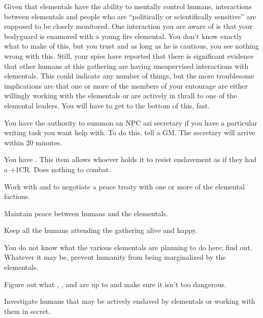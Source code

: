 \documentclass[char]{elementals}
\begin{document}
Given that elementals have the ability to mentally control humans, interactions between elementals and people who are ``politically or scientifically sensitive'' are supposed to be closely monitored. One interaction you are aware of is that your bodyguard \cRomeo{} is enamored with a young fire elemental. You don't know exactly what to make of this, but you trust \cRomeo{} and as long as he is cautious, you see nothing wrong with this. Still, your spies have reported that there is significant evidence that other humans at this gathering are having unsupervised interactions with elementals. This could indicate any number of things, but the more troublesome implications are that one or more of the members of your entourage are either willingly working with the elementals or are actively in thrall to one of the elemental leaders. You will have to get to the bottom of this, fast.



\begin{itemz}[Notes]
	\item  You have the authority to summon an NPC azi secretary if you have a particular writing task you want help with. To do this, tell a GM. The secretary will arrive within 20 minutes.
	\item You have \iEleShield{}. This item allows whoever holds it to resist enslavement as if they had a +1CR. Does nothing to combat.
\end{itemz}

\begin{itemz}[Goals]
  \item Work with \cAvatar{} and \cDiplomat{} to negotiate a peace treaty with one or more of the elemental factions.
  \item Maintain peace between humans and the elementals.
  \item Keep all the humans attending the gathering alive and happy.
  \item You do not know what the various elementals are planning to do here; find out. Whatever it may be, prevent humanity from being marginalized by the elementals.
  \item Figure out what \cGD{}, \cMS{}, and \cScientist{} are up to and make sure it isn't too dangerous.
  \item Investigate humans that may be actively enslaved by elementals or working with them in secret.
\end{itemz}
\end{document}
